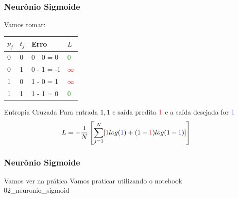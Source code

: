 \documentclass{beamer}
\begin{document}
\begin{frame}
	\frametitle{Neurônio Sigmoide}
	Vamos tomar:
	\begin{table}[]
		\begin{tabular}{|l|l|l|l|}
			\hline
			$p_j$ & $t_j$ & Erro  & $L$ \\ \hline
			0  & 0  & 0 - 0 = 0  & \textcolor{green}{0}  \\ \hline
			0  & 1  & 0 - 1 = -1 & \textcolor{red}{$\infty$} \\ \hline
			1  & 0  & 1 - 0 = 1  & \textcolor{red}{$\infty$} \\ \hline
			1  & 1  & 1 - 1 = 0  & \textcolor{green}{0} \\ \hline
		\end{tabular}
	\end{table}
	\begin{block}{Entropia Cruzada}
		Para entrada $1, 1$ e saída predita $\textcolor{red}{1}$ e a saída desejada for $\textcolor{blue}{1}$
		\begin{gather*}
			L = - \frac{1}{N} \left [ \sum_{j=1}^{N} [\textcolor{red}{1} log(\textcolor{blue}{1} ) + (1-\textcolor{red}{1})log(1-\textcolor{blue}{1} )] \right ] 
		\end{gather*}
	\end{block}
\end{frame}

\begin{frame}
	\frametitle{Neurônio Sigmoide}
	\begin{block}{Vamos ver na prática}
		Vamos praticar utilizando o notebook 02\_neuronio\_sigmoid
	\end{block}
\end{frame}

\end{document}
